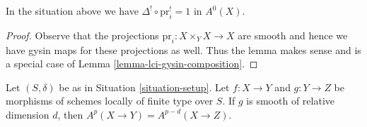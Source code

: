 \begin{lemma}
\label{lemma-diagonal-identity}
In the situation above we have $\Delta^! \circ \text{pr}_i^! = 1$ in $A^0(X)$.
\end{lemma}

\begin{proof}
Observe that the projections $\text{pr}_i : X \times_Y X \to X$ are
smooth and hence we have gysin maps for these projections as well.
Thus the lemma makes sense and is a special case of
Lemma \ref{lemma-lci-gysin-composition}.
\end{proof}

\begin{proposition}
\label{proposition-compute-bivariant}
\begin{reference}
\cite[Proposition 17.4.2]{F}
\end{reference}
Let $(S, \delta)$ be as in Situation \ref{situation-setup}.
Let $f : X \to Y$ and $g : Y \to Z$ be morphisms of schemes locally
of finite type over $S$. If $g$ is smooth of relative dimension $d$, then
$A^p(X \to Y) = A^{p - d}(X \to Z)$.
\end{proposition}


